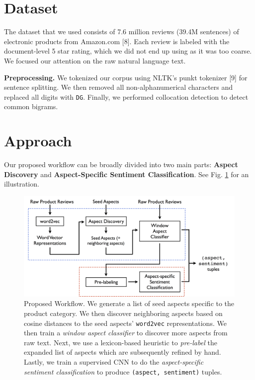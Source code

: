 \documentclass{article} %
\begin{document}

\section{Dataset}
The dataset that we used consists of 7.6 million reviews (39.4M sentences) of electronic products from Amazon.com [8]. Each review is labeled with the document-level 5 star rating, which we did not end up using as it was too coarse. We focused our attention on the raw natural language text.

\textbf{Preprocessing.} We tokenized our corpus using NLTK's punkt tokenizer [9] for sentence splitting. We then removed all non-alphanumerical characters and replaced all digits with \texttt{DG}. Finally, we performed collocation detection to detect common bigrams.

\section{Approach}

Our proposed workflow can be broadly divided into two main parts: {\bf Aspect Discovery} and {\bf Aspect-Specific Sentiment Classification}. See Fig. \ref{workflow} for an illustration.

\begin{figure}[ht]
\begin{center}
\includegraphics[width=.85\columnwidth]{workflow.png}
\end{center}
\caption{Proposed Workflow. We generate a list of seed aspects specific to the product category. We then discover neighboring aspects based on cosine distances to the seed aspects' \texttt{word2vec} representations. We then train a \textit{window aspect classifier} to discover more aspects from raw text. Next, we use a lexicon-based heuristic to \textit{pre-label} the expanded list of aspects which are subsequently refined by hand. Lastly, we train a supervised CNN to do the \textit{aspect-specific sentiment classification} to produce \texttt{(aspect, sentiment)} tuples.}
\label{workflow}
\end{figure}
\end{document}
